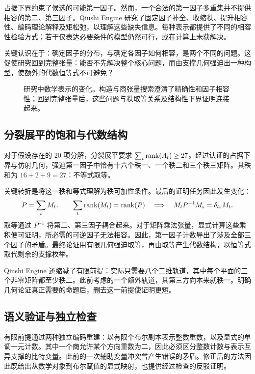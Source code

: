 占据下界约束了候选的可能第一因子。然而，一个合法的第一因子多重集并不提供相容的第二、第三因子。Qiushi Engine 研究了固定因子补全、收缩秩、提升相容性、编码理论解释及矩松弛，以理解这些缺失信息。每种表示都提供了不同的相容性检验方式；若干仅表达必要条件的模型仍然可行，或在计算上未获解决。

关键认识在于：确定因子的分布，与确定各因子如何相容，是两个不同的问题。这促使研究回到完整张量：能否不先解决整个核心问题，而由支撑几何强迫出一种构型，使额外的代数恒等式不可避免？

\begin{figure}[tbp]
  \centering
  \makebox[\linewidth][c]{\unskip}
  \caption{研究中数学表示的变化。构造与商张量搜索澄清了精确性和因子相容性；回到完整张量后，这些问题与秩取等关系及结构性下界证明连接起来。}
  \label{fig:research-route}
\end{figure}

\subsection{分裂展平的饱和与代数结构}

对于假设存在的 20 项分解，分裂展平要求 $\sum_t\operatorname{rank}(A_t)\ge27$。经过认证的占据下界与仿射几何，强迫第一因子中恰有十六个秩一、一个秩二和三个秩三矩阵。其秩和为 $16+2+9=27$：不等式取等。

关键转折是将这一秩和等式理解为秩可加性条件。最后的证明任务因此发生变化：
\[
  P=\sum_tM_t,\qquad\sum_t\operatorname{rank}(M_t)=\operatorname{rank}(P)
  \quad\Longrightarrow\quad M_tP^{-1}M_s=\delta_{ts}M_t.
\]
取等通过 $P^{-1}$ 将第二、第三因子耦合起来。对于矩阵乘法张量，显式计算这些乘积便可证明，所必需的可逆因子无法相容。因此，第一因子计数导出了涉及全部三个因子的矛盾。最终论证用有限几何强迫取等，再由取等产生代数结构，以恒等式取代剩余的支撑枚举。

Qiushi Engine 还缩减了有限前提：实际只需要八个二维轨道，其中每个平面的三个非零矩阵都至少秩二。此前考虑的一个额外轨道，其第三方向本来就秩一。明确几何论证真正需要的命题后，删去这一前提使证明更短。

\subsection{语义验证与独立检查}

有限前提通过两种独立编码重建：以有限个布尔副本表示整数重数，以及显式的单调一元计数。其中一个商允许某个方向重数为二，因此必须区分整数计数与表示互异支撑的比特变量。此前的一次辅助变量冲突曾产生错误的矛盾。修正后的方法因此既给出从数学对象到布尔赋值的显式映射，也提供经过检查的反驳证明。

